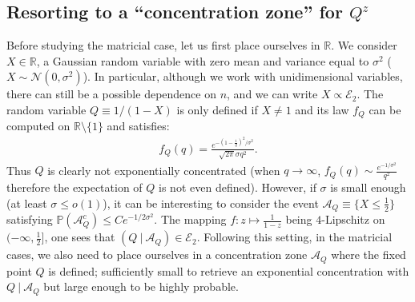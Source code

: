 \documentclass[a4papaer, titlepage]{book}
\begin{document}
\subsection{Resorting to a ``concentration zone'' for $Q^z$}\label{sse:concentration_zone}
Before studying the matricial case, let us first place ourselves in $\mathbb R$.
We consider $X \in \mathbb R$, a Gaussian random variable with zero mean and variance equal to $\sigma^2$ ($X \sim \mathcal N(0,\sigma^2)$). In particular, although we work with unidimensional variables, there can still be a possible dependence on $n$, and we can write $X \propto \mathcal E_2$. 
The random variable $Q \equiv 1/(1-X)$ is only defined if $X \neq 1$ and its law $f_Q$ can be computed on $\mathbb R \setminus\{1\}$ and satisfies:
  \begin{align*}
    f_Q(q) = \frac{e^{-(1- \frac{1}{q})^2/\sigma^2}}{\sqrt{2\pi}\sigma q^2}.
  \end{align*}
  Thus $Q$ is clearly not exponentially concentrated (when $q \to \infty$, $f_Q(q) \sim \frac{e^{-1/\sigma^2}}{q^2}$ therefore the expectation of $Q$ is not even defined). 
  However, if $\sigma$ is small enough (at least $\sigma \leq o(1)$), it can be interesting to consider the event $\mathcal A_Q \equiv \{X \leq \frac{1}{2} \}$ satisfying $\mathbb P(\mathcal A_Q^c) \leq C e^{-1/2\sigma^2}$. 
  The mapping $f:z \mapsto \frac{1}{1-z}$ being $4$-Lipschitz on $(-\infty,\frac{1}{2}]$, one sees that $(Q \ | \ \mathcal A_Q) \in \mathcal E_2$. 
  Following this setting, in the matricial cases, we also need to place ourselves in a concentration zone $\mathcal A_Q$ where the fixed point $Q$ is defined; sufficiently small to retrieve an exponential concentration with $Q \ | \ \mathcal A_Q$ but large enough to be highly probable. 
\end{document}
